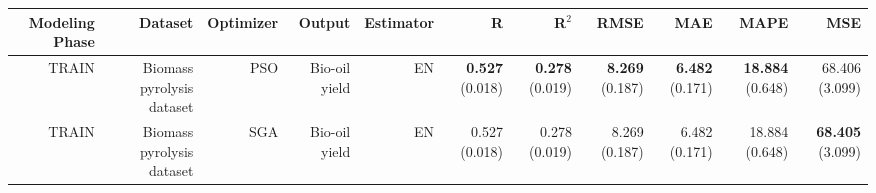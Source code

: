 \begin{table}
\centering
\label{eml___comparison_datasets_table_en_biomass_pyrolysis_dataset_train.tex}
\begin{tabular}{rrrrrrrrrrr}
\toprule
Modeling Phase &                   Dataset & Optimizer &        Output & Estimator &                    R &                R$^2$ &                 RMSE &                  MAE &                  MAPE &                   MSE \\
\midrule
         TRAIN & Biomass pyrolysis dataset &       PSO & Bio-oil yield &        EN & { \bf 0.527} (0.018) & { \bf 0.278} (0.019) & { \bf 8.269} (0.187) & { \bf 6.482} (0.171) & { \bf 18.884} (0.648) &        68.406 (3.099) \\
         TRAIN & Biomass pyrolysis dataset &       SGA & Bio-oil yield &        EN &        0.527 (0.018) &        0.278 (0.019) &        8.269 (0.187) &        6.482 (0.171) &        18.884 (0.648) & { \bf 68.405} (3.099) \\
\bottomrule
\end{tabular}
\end{table}
